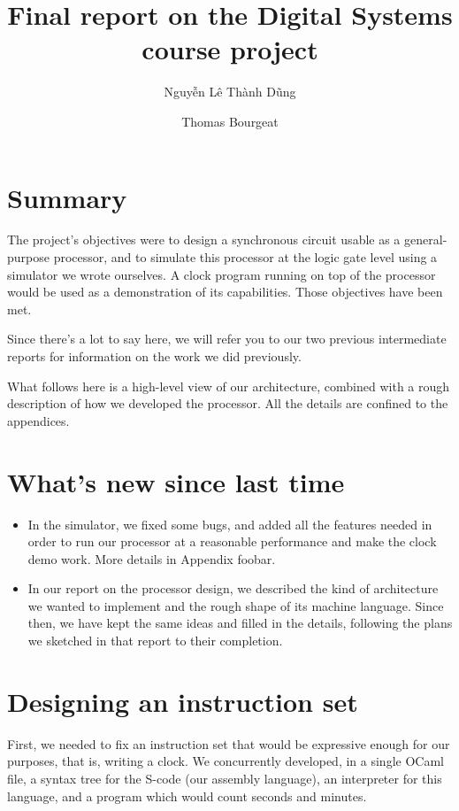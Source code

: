 \documentclass[a4paper, 11pt]{article}
\begin{document}
\title{Final report on the Digital Systems course project}
\author{Nguyễn Lê Thành Dũng \and Thomas Bourgeat}

\maketitle

\section{Summary}

The project's objectives were to design a synchronous circuit usable as a general-purpose processor, and to simulate this processor at the logic gate level using a simulator we wrote ourselves. A clock program running on top of the processor would be used as a demonstration of its capabilities. Those objectives have been met.

Since there's a lot to say here, we will refer you to our two previous intermediate reports for information on the work we did previously.

What follows here is a high-level view of our architecture, combined with a rough description of how we developed the processor. All the details are confined to the appendices.

\section{What's new since last time}

\begin{itemize}
\item In the simulator, we fixed some bugs, and added all the features needed in order to run our processor at a reasonable performance and make the clock demo work. More details in Appendix foobar.
\item In our report on the processor design, we described the kind of architecture we wanted to implement and the rough shape of its machine language. Since then, we have kept the same ideas and filled in the details, following the plans we sketched in that report to their completion.
\end{itemize}

\section{Designing an instruction set}

First, we needed to fix an instruction set that would be expressive enough for our purposes, that is, writing a clock. We concurrently developed, in a single OCaml file, a syntax tree for the S-code (our assembly language), an interpreter for this language, and a program which would count seconds and minutes. 
\end{document}
